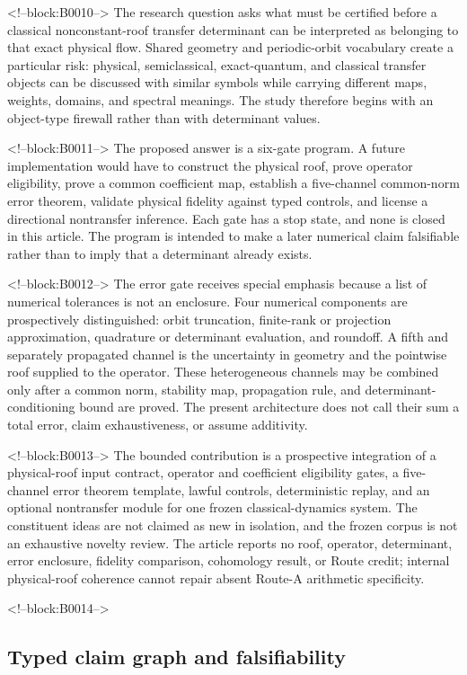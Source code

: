 \documentclass[11pt,a4paper]{article}
\begin{document}
<!--block:B0010-->
The research question asks what must be certified before a classical nonconstant-roof transfer determinant can be interpreted as belonging to that exact physical flow. Shared geometry and periodic-orbit vocabulary create a particular risk: physical, semiclassical, exact-quantum, and classical transfer objects can be discussed with similar symbols while carrying different maps, weights, domains, and spectral meanings. The study therefore begins with an object-type firewall rather than with determinant values.

<!--block:B0011-->
The proposed answer is a six-gate program. A future implementation would have to construct the physical roof, prove operator eligibility, prove a common coefficient map, establish a five-channel common-norm error theorem, validate physical fidelity against typed controls, and license a directional nontransfer inference. Each gate has a stop state, and none is closed in this article. The program is intended to make a later numerical claim falsifiable rather than to imply that a determinant already exists.

<!--block:B0012-->
The error gate receives special emphasis because a list of numerical tolerances is not an enclosure. Four numerical components are prospectively distinguished: orbit truncation, finite-rank or projection approximation, quadrature or determinant evaluation, and roundoff. A fifth and separately propagated channel is the uncertainty in geometry and the pointwise roof supplied to the operator. These heterogeneous channels may be combined only after a common norm, stability map, propagation rule, and determinant-conditioning bound are proved. The present architecture does not call their sum a total error, claim exhaustiveness, or assume additivity.

<!--block:B0013-->
The bounded contribution is a prospective integration of a physical-roof input contract, operator and coefficient eligibility gates, a five-channel error theorem template, lawful controls, deterministic replay, and an optional nontransfer module for one frozen classical-dynamics system. The constituent ideas are not claimed as new in isolation, and the frozen corpus is not an exhaustive novelty review. The article reports no roof, operator, determinant, error enclosure, fidelity comparison, cohomology result, or Route credit; internal physical-roof coherence cannot repair absent Route-A arithmetic specificity.

<!--block:B0014-->
\subsection{Typed claim graph and falsifiability}
\end{document}
